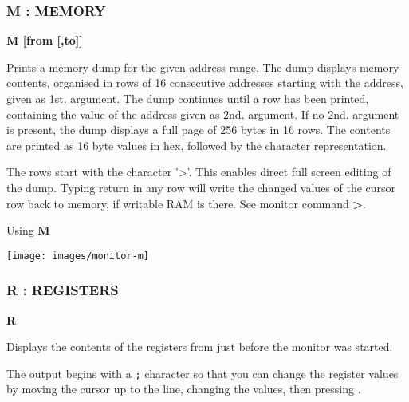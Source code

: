 \subsubsection{M : MEMORY}
\begin{description}[leftmargin=2cm,style=nextline]
\item [Format:] {\bf M [from [,to]]}
\item [Usage:] Prints a memory dump for the given address range.
               The dump displays memory contents, organised in rows
               of 16 consecutive addresses starting with the
               address, given as 1st. argument. The dump continues
               until a row has been printed, containing the value
               of the address given as 2nd. argument.
               If no 2nd. argument is present, the dump displays
               a full page of 256 bytes in 16 rows.
               The contents are printed as 16 byte values in hex,
               followed by the character representation.

\item [Remarks:] The rows start with the character '>'.
                 This enables direct full screen editing of the dump.
                 Typing return in any row will write the changed
                 values of the cursor row back to memory, if writable RAM is there.
                 See monitor command {\bf >}.

\item [Example:] Using {\bf M}
\end{description}
\texttt{[image: images/monitor-m]}


\subsubsection{R : REGISTERS}
\begin{description}[leftmargin=2cm,style=nextline]
\item [Format:] {\bf R}
\item [Usage:] Displays the contents of the registers from just before the monitor was started.

\item [Remarks:] The output begins with a {\tt ;} character so that you can change the register values by moving the cursor up to the line, changing the values, then pressing .

\end{description}

